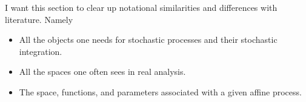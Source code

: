 I want this section to clear up notational similarities and differences with literature.
Namely
\begin{itemize}
  \item
    All the objects one needs for stochastic processes and their stochastic integration.
  \item
    All the spaces one often sees in real analysis.
  \item
    The space, functions, and parameters associated with a given affine process.
\end{itemize}
